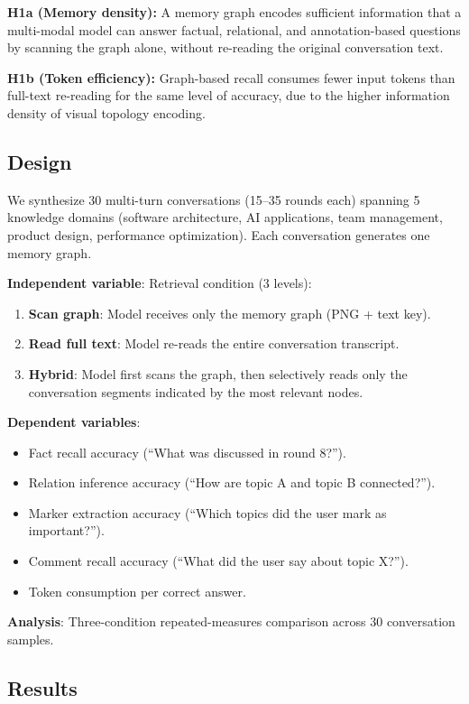 \documentclass[11pt,a4paper]{article}
\begin{document}
\textbf{H1a (Memory density):} A memory graph encodes sufficient information that a multi-modal model can answer factual, relational, and annotation-based questions by scanning the graph alone, without re-reading the original conversation text.

\textbf{H1b (Token efficiency):} Graph-based recall consumes fewer input tokens than full-text re-reading for the same level of accuracy, due to the higher information density of visual topology encoding.

\subsection{Design}

We synthesize 30 multi-turn conversations (15--35 rounds each) spanning 5 knowledge domains (software architecture, AI applications, team management, product design, performance optimization). Each conversation generates one memory graph.

\textbf{Independent variable}: Retrieval condition (3 levels):
\begin{enumerate}[nosep]
\item \textbf{Scan graph}: Model receives only the memory graph (PNG + text key).
\item \textbf{Read full text}: Model re-reads the entire conversation transcript.
\item \textbf{Hybrid}: Model first scans the graph, then selectively reads only the conversation segments indicated by the most relevant nodes.
\end{enumerate}

\textbf{Dependent variables}:
\begin{itemize}[nosep]
\item Fact recall accuracy (``What was discussed in round 8?'').
\item Relation inference accuracy (``How are topic A and topic B connected?'').
\item Marker extraction accuracy (``Which topics did the user mark as important?'').
\item Comment recall accuracy (``What did the user say about topic X?'').
\item Token consumption per correct answer.
\end{itemize}

\textbf{Analysis}: Three-condition repeated-measures comparison across 30 conversation samples.

\subsection{Results}
\end{document}
